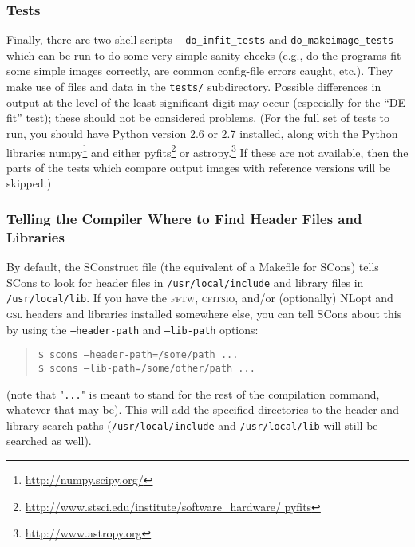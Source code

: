 \documentclass[10pt,a4paper,article]{memoir}
\newcommand{\Imfit}{\texttt{Imfit}}
\newcommand{\makeimage}{\texttt{makeimage}}
\begin{document}
\subsubsection{Tests}

Finally, there are two shell scripts -- \texttt{do\_imfit\_tests} and
\texttt{do\_makeimage\_tests} -- which can be run to do some very simple
sanity checks (e.g., do the programs fit some simple images correctly,
are common config-file errors caught, etc.). They make use of files and
data in the \texttt{tests/} subdirectory. Possible differences in output
at the level of the least significant digit may occur (especially for
the ``DE fit'' test); these should not be considered problems. (For the
full set of tests to run, you should have Python version 2.6 or 2.7
installed, along with the Python libraries numpy\footnote{\url{http://numpy.scipy.org/}}
and either
pyfits\footnote{\url{http://www.stsci.edu/institute/software_hardware/
pyfits}} or astropy.\footnote{\url{http://www.astropy.org}} If these are not available, then the parts of
the tests which compare output images with reference versions will
be skipped.)


%
%


\subsubsection{Telling the Compiler Where to Find Header Files and Libraries}

By default, the SConstruct file (the equivalent of a Makefile for SCons)
tells SCons to look for header files in \texttt{/usr/local/include} and
library files in \texttt{/usr/local/lib}. If you have the \textsc{fftw},
\textsc{cfitsio}, and/or (optionally) NLopt and \textsc{gsl} headers and
libraries installed somewhere else, you can tell SCons about this by
using the
\texttt{--header-path} and \texttt{--lib-path} options:
\begin{quote}
\texttt{\$ scons --header-path=/some/path ...} \\
\texttt{\$ scons --lib-path=/some/other/path ...}
\end{quote}
(note that "\texttt{...}" is meant to stand for the rest of the compilation command,
whatever that may be). This will add the specified directories to the
header and library search paths (\texttt{/usr/local/include} and \texttt{/usr/local/lib}
will still be searched as well).
\end{document}
